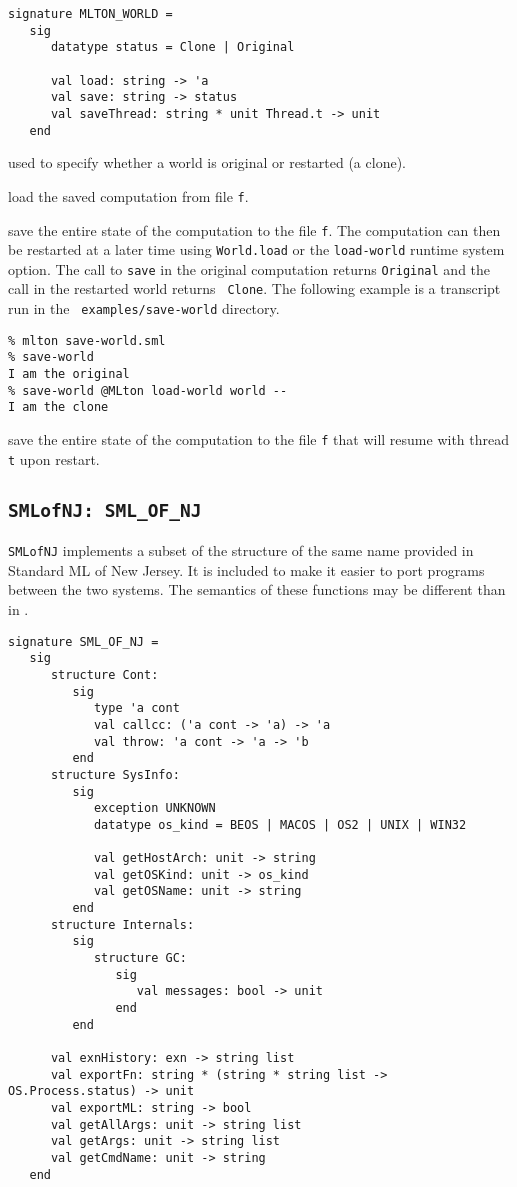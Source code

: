 \begin{verbatim}
signature MLTON_WORLD =
   sig
      datatype status = Clone | Original

      val load: string -> 'a
      val save: string -> status
      val saveThread: string * unit Thread.t -> unit
   end
\end{verbatim}

\begin{description}
used to specify whether a world is original or restarted (a clone).

load the saved computation from file {\tt f}.

save the entire state of the computation to
the file {\tt f}.  The computation can then be restarted at a later
time using {\tt World.load} or the {\tt load-world} runtime system
option.  The call to {\tt save} in the original computation returns
{\tt Original} and the call in the restarted world returns {\tt
Clone}.  The following example is a transcript run in the {\tt
examples/save-world} directory.
\begin{verbatim}
% mlton save-world.sml
% save-world
I am the original
% save-world @MLton load-world world --
I am the clone
\end{verbatim}

save the entire state of the computation to
the file {\tt f} that will resume with thread {\tt t} upon restart.

\end{description}
%
\subsection{{\tt SMLofNJ: SML\_OF\_NJ}}

{\tt SMLofNJ} implements a subset of the structure of the same name
provided in Standard ML of New Jersey.  It is included to make it
easier to port programs between the two systems.  The semantics of
these functions may be different than in {\smlnj}.

\begin{verbatim}
signature SML_OF_NJ =
   sig
      structure Cont:
         sig
            type 'a cont
            val callcc: ('a cont -> 'a) -> 'a
            val throw: 'a cont -> 'a -> 'b
         end
      structure SysInfo:
         sig
            exception UNKNOWN
            datatype os_kind = BEOS | MACOS | OS2 | UNIX | WIN32

            val getHostArch: unit -> string
            val getOSKind: unit -> os_kind
            val getOSName: unit -> string
         end
      structure Internals:
         sig
            structure GC:
               sig
                  val messages: bool -> unit
               end             
         end

      val exnHistory: exn -> string list
      val exportFn: string * (string * string list -> OS.Process.status) -> unit
      val exportML: string -> bool
      val getAllArgs: unit -> string list
      val getArgs: unit -> string list
      val getCmdName: unit -> string
   end
\end{verbatim}

